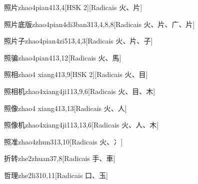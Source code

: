 \begin{entry}{照片}{zhao4pian4}{13,4}[HSK 2][Radicais ⽕、⽚]
\end{entry}

\begin{entry}{照片底版}{zhao4pian4di3ban3}{13,4,8,8}[Radicais ⽕、⽚、⼴、⽚]
\end{entry}

\begin{entry}{照片子}{zhao4pian4zi5}{13,4,3}[Radicais ⽕、⽚、⼦]
\end{entry}

\begin{entry}{照骗}{zhao4pian4}{13,12}[Radicais ⽕、⾺]
\end{entry}

\begin{entry}{照相}{zhao4 xiang4}{13,9}[HSK 2][Radicais ⽕、⽬]
\end{entry}

\begin{entry}{照相机}{zhao4xiang4ji1}{13,9,6}[Radicais ⽕、⽬、⽊]
\end{entry}

\begin{entry}{照像}{zhao4 xiang4}{13,13}[Radicais ⽕、⼈]
\end{entry}

\begin{entry}{照像机}{zhao4xiang4ji1}{13,13,6}[Radicais ⽕、⼈、⽊]
\end{entry}

\begin{entry}{照准}{zhao4zhun3}{13,10}[Radicais ⽕、⼎]
\end{entry}

\begin{entry}{折转}{zhe2zhuan3}{7,8}[Radicais ⼿、⾞]
\end{entry}

\begin{entry}{哲理}{zhe2li3}{10,11}[Radicais ⼝、⽟]
\end{entry}

